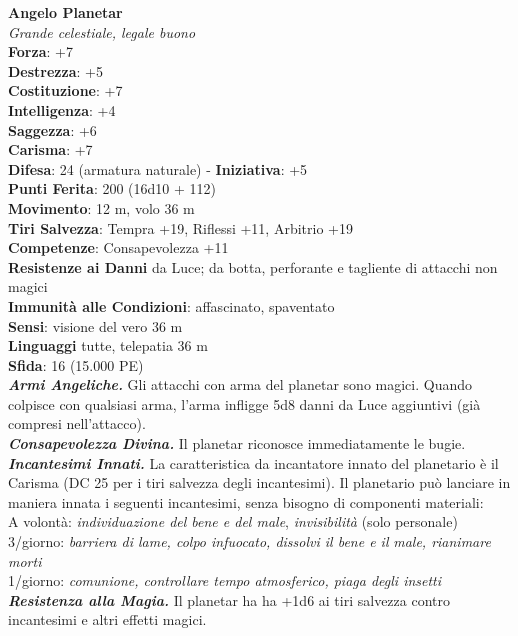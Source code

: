 \begin{multicols}{2}
\medskip\textbf{Angelo Planetar}\\
\emph{Grande celestiale, legale buono}\\
\textbf{Forza}: +7\\
\textbf{Destrezza}: +5\\
\textbf{Costituzione}: +7\\
\textbf{Intelligenza}: +4\\
\textbf{Saggezza}: +6\\
\textbf{Carisma}: +7\\
\textbf{Difesa}: 24 (armatura naturale) - \textbf{Iniziativa}: +5\\
\textbf{Punti Ferita}: 200 (16d10 + 112)\\
\textbf{Movimento}: 12 m, volo 36 m\\
\textbf{Tiri Salvezza}: Tempra +19, Riflessi +11, Arbitrio +19\\
\textbf{Competenze}: Consapevolezza +11\\
\textbf{Resistenze ai Danni} da Luce; da botta, perforante e tagliente di attacchi non magici\\
\textbf{Immunità alle Condizioni}: affascinato, spaventato\\
\textbf{Sensi}: visione del vero 36 m\\
\textbf{Linguaggi} tutte, telepatia 36 m\\
\textbf{Sfida}: 16 (15.000 PE)\smallskip\\
\emph{\textbf{Armi Angeliche.}} Gli attacchi con arma del planetar sono magici. Quando colpisce con qualsiasi arma, l'arma infligge 5d8 danni da Luce aggiuntivi (già compresi nell'attacco).\\
\emph{\textbf{Consapevolezza Divina.}} Il planetar riconosce immediatamente le bugie.\\
\emph{\textbf{Incantesimi Innati.}} La caratteristica da incantatore innato del planetario è il Carisma (DC  25 per i tiri salvezza degli incantesimi). Il planetario può lanciare in maniera innata i seguenti incantesimi, senza bisogno di componenti materiali:\\
A volontà: \emph{individuazione del bene e del male}, \emph{invisibilità} (solo personale)\\
3/giorno: \emph{barriera di lame, colpo infuocato, dissolvi il bene e il} \emph{male, rianimare morti}\\
1/giorno: \emph{comunione, controllare tempo atmosferico, piaga degli insetti}\\
\emph{\textbf{Resistenza alla Magia.}} Il planetar ha ha +1d6 ai tiri salvezza contro incantesimi e altri effetti magici.\\

\end{multicols}
